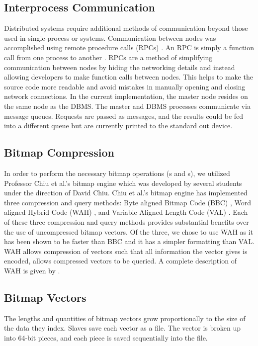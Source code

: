 \subsection{Interprocess Communication}
Distributed systems require additional methods of communication beyond those
used in single-process or systems. Communication between nodes was accomplished
using remote procedure calls (RPCs) \cite{rpcgen}. An RPC is simply a function
call from one process to another \cite{tanenbaum1994}. RPCs are a method of
simplifying communication between nodes by hiding the networking details and
instead allowing developers to make function calls between nodes. This helps to
make the source code more readable and avoid mistakes in manually opening and
closing network connections. In the current implementation, the master node
resides on the same node as the DBMS. The master and DBMS processes
communicate via message queues. \cite{unixSystemV} Requests are passed as
messages, and the results could be fed into a different queue but are currently
printed to the standard out device.
%
\subsection{Bitmap Compression}
In order to perform the necessary bitmap operations (s and
s), we utilized Professor Chiu et al.'s bitmap engine which was
developed by several students under the direction of David Chiu. Chiu et al.'s
bitmap engine has implemented three compression and query methods: Byte aligned
Bitmap Code (BBC) \cite{wu2001}, Word aligned Hybrid Code (WAH) \cite{wu2001},
and Variable Aligned Length Code (VAL) \cite{guzun2014}. Each of these three
compression and query methods provides substantial benefits over the use of
uncompressed bitmap vectors. Of the three, we chose to use WAH as it has been
shown to be faster than BBC and it has a simpler formatting than VAL. WAH
allows compression of vectors such that all information the vector gives is
encoded, allows compressed vectors to be queried. A complete description of WAH
is given by \cite{wu2001}.
%
\subsection{Bitmap Vectors}
The lengths and quantities of bitmap vectors grow proportionally to the size of
the data they index. Slaves save each vector as a file. The vector is broken up
into 64-bit pieces, and each piece is saved sequentially into the file.
%
